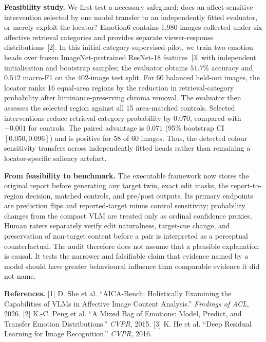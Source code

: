 \documentclass[10pt]{article}
\begin{document}
\textbf{Feasibility study.}
We first test a necessary safeguard: does an affect-sensitive intervention selected by one model transfer to an independently fitted evaluator, or merely exploit the locator? Emotion6 contains 1,980 images collected under six affective retrieval categories and provides separate viewer-response distributions~[2]. In this initial category-supervised pilot, we train two emotion heads over frozen ImageNet-pretrained ResNet-18 features~[3] with independent initialisation and bootstrap samples; the evaluator obtains $51.7\%$ accuracy and $0.512$ macro-F1 on the 402-image test split. For 60 balanced held-out images, the locator ranks 16 equal-area regions by the reduction in retrieval-category probability after luminance-preserving chroma removal. The evaluator then assesses the selected region against all 15 area-matched controls. Selected interventions reduce retrieval-category probability by $0.070$, compared with $-0.001$ for controls. The paired advantage is $0.071$ (95\% bootstrap CI $[0.050,0.096]$) and is positive for 58 of 60 images. Thus, the detected colour sensitivity transfers across independently fitted heads rather than remaining a locator-specific saliency artefact.

\textbf{From feasibility to benchmark.}
The executable framework now stores the original report before generating any target twin, exact edit masks, the report-to-region decision, matched controls, and pre/post outputs. Its primary endpoints are prediction flips and reported-target minus control sensitivity; probability changes from the compact VLM are treated only as ordinal confidence proxies. Human raters separately verify edit naturalness, target-cue change, and preservation of non-target content before a pair is interpreted as a perceptual counterfactual. The audit therefore does not assume that a plausible explanation is causal. It tests the narrower and falsifiable claim that evidence named by a model should have greater behavioural influence than comparable evidence it did not name.

\vspace{0.1em}
{\footnotesize\textbf{References.}
[1] D. She et al. ``AICA-Bench: Holistically Examining the Capabilities of VLMs in Affective Image Content Analysis.'' \emph{Findings of ACL}, 2026.
[2] K.-C. Peng et al. ``A Mixed Bag of Emotions: Model, Predict, and Transfer Emotion Distributions.'' \emph{CVPR}, 2015.
[3] K. He et al. ``Deep Residual Learning for Image Recognition.'' \emph{CVPR}, 2016.}
\end{document}
